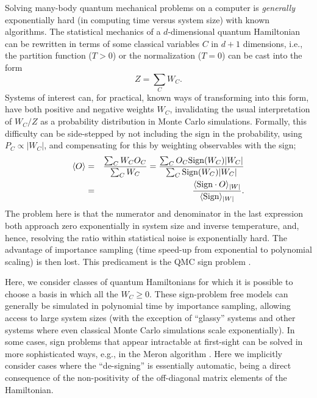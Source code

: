 \documentclass[10pt,pre,aps,twocolumn,showpacs,superscriptaddress,floatfix]{revtex4-1}
\begin{document}
Solving many-body quantum mechanical problems on a computer is {\em generally} exponentially hard (in computing time versus system size) 
with known algorithms. The statistical mechanics of a $d$-dimensional quantum Hamiltonian can be rewritten in terms of some classical variables 
$C$ in $d+1$ dimensions, i.e., the partition function ($T>0$) or the normalization ($T=0$) can be cast into the form
\begin{equation}
\label{eq:wc}
Z=\sum_C W_C.
\end{equation}
Systems of interest can, for practical, known ways of transforming into this form, have both positive and negative weights $W_C$, 
invalidating the usual interpretation of $W_C/Z$ as a probability distribution in Monte Carlo simulations. Formally, this difficulty 
can be side-stepped by not including the sign in the probability, using $P_C \propto |W_C|$, and compensating for this by weighting 
observables with the sign;
\begin{eqnarray}
\langle O \rangle & = & \frac{\sum_C W_C O_C}{\sum_C W_C} = \frac{\sum_C O_C {\rm Sign}(W_C) |W_C|}{\sum_C {\rm Sign}(W_C)|W_C|} \nonumber\\
& = & \frac{\langle {\rm Sign} \cdot O\rangle_{|W|}}{\langle {\rm Sign}\rangle_{|W|}}.
\label{expvalue}
\end{eqnarray}
The problem here is that the numerator and denominator in the last expression both approach zero
exponentially in system size and inverse temperature, and, hence, resolving the ratio within 
statistical noise is exponentially hard. The advantage of importance sampling (time speed-up from exponential 
to polynomial scaling) is then lost. This predicament is the QMC sign problem \cite{Loh90,Henelius00,Nyfeler08}.

Here, we consider classes of quantum Hamiltonians for which it is possible to choose a basis in which all the $W_C\geq 0$. 
These sign-problem free models can generally be simulated in polynomial time by 
importance sampling, allowing access to large system sizes (with the exception of ``glassy'' systems and
other systems where even classical Monte Carlo simulations scale exponentially). In some cases, sign problems that
appear intractable at first-sight can be solved in more sophisticated ways, e.g., in the Meron algorithm \cite{Chandrasekharan99}. 
Here we implicitly consider cases where the ``de-signing'' is essentially automatic, being a direct consequence of the non-positivity of the  
off-diagonal matrix elements of the Hamiltonian.
 
\end{document}
